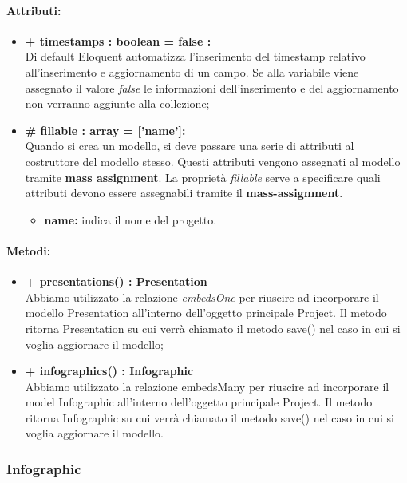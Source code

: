 	\paragraph{Attributi:}
	\begin{itemize}
		\item \textbf{+ timestamps : boolean = false :}\\
		Di default Eloquent automatizza l'inserimento del timestamp relativo all'inserimento e aggiornamento di un campo. Se alla variabile viene assegnato il valore \textit{false} le informazioni dell'inserimento e del aggiornamento non verranno aggiunte alla collezione;
		\item \textbf{\# fillable : array = [’name’]:}\\
		Quando si crea un modello, si deve passare una serie di attributi al costruttore del modello stesso. Questi attributi vengono assegnati al modello tramite \textbf{mass assignment}. La proprietà \textit{fillable} serve a specificare quali attributi devono essere assegnabili tramite il \textbf{mass-assignment}.
		\begin{itemize}
			\item \textbf{name:} indica il nome del progetto.
		\end{itemize}
	\end{itemize}
	
	\paragraph{Metodi:}
	\begin{itemize}
		\item \textbf{+ presentations() : Presentation}\\
		Abbiamo utilizzato la relazione \textit{embedsOne} per riuscire ad incorporare il modello Presentation all'interno dell'oggetto principale Project. Il metodo ritorna Presentation su cui verrà chiamato il metodo save() nel caso in cui si voglia aggiornare il modello;
		\item \textbf{+ infographics() : Infographic}\\
		Abbiamo utilizzato la relazione embedsMany per riuscire ad incorporare il model Infographic all’interno dell’oggetto principale Project. Il metodo ritorna Infographic su cui verrà chiamato il metodo save() nel caso in cui si voglia aggiornare il modello.
	\end{itemize}

\newpage
\subsubsection{Infographic}


